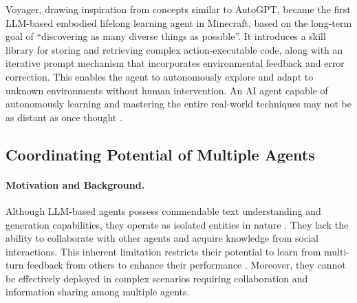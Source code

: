 Voyager\cite{DBLP:journals/corr/abs-2305-16291}, drawing inspiration from concepts similar to AutoGPT\cite{gravitasauto}, became the first LLM-based embodied lifelong learning agent in Minecraft, based on the long-term goal of ``discovering as many diverse things as possible''. It introduces a skill library for storing and retrieving complex action-executable code, along with an iterative prompt mechanism that incorporates environmental feedback and error correction. This enables the agent to autonomously explore and adapt to unknown environments without human intervention. An AI agent capable of autonomously learning and mastering the entire real-world techniques may not be as distant as once thought \cite{DBLP:journals/corr/abs-2303-16563}.


\subsection{Coordinating Potential of Multiple Agents} \label{sec:Collaborative Potential of Multi Agents}
\paragraph{Motivation and Background.} Although LLM-based agents possess commendable text understanding and generation capabilities, they operate as isolated entities in nature \cite{DBLP:journals/corr/abs-2306-03314}. They lack the ability to collaborate with other agents and acquire knowledge from social interactions. This inherent limitation restricts their potential to learn from multi-turn feedback from others to enhance their performance \cite{DBLP:journals/corr/abs-2305-16960}. Moreover, they cannot be effectively deployed in complex scenarios requiring collaboration and information sharing among multiple agents.

